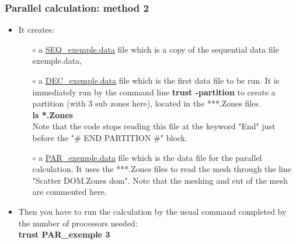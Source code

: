 \documentclass[10pt, hyperref={unicode=true,pdfusetitle, bookmarks=true,bookmarksnumbered=false,bookmarksopen=false, breaklinks=false,pdfborder={0 0 1},backref=true,colorlinks=true,linkcolor=darkblue,pageanchor}]{beamer}
\begin{document}
\begin{frame}
\frametitle{Parallel calculation: method 2}
\begin{block}{}

\begin{itemize}
\item It creates:
    \begin{itemize} 
    \item [$\circ$] a \underline{SEQ\_exemple.data} file which is a copy of the sequential data file exemple.data,
    \item [$\circ$] a \underline{DEC\_exemple.data} file which is the first data file to be run. It is immediately run by the command line \textbf{trust -partition} to create a partition (with 3 sub zones here), located in the ***.Zones files. \\
    \textbf{ls *.Zones}\\
    Note that the code stops reading this file at the keyword "End" just before the "\# END PARTITION \#" block.
    \item [$\circ$] a \underline{PAR\_exemple.data} file which is the data file for the parallel calculation. It uses the ***.Zones files to read the mesh through the line "Scatter DOM.Zones dom". Note that the meshing and cut of the mesh are commented here.
    \end{itemize}

\item Then you have to run the calculation by the usual command completed by the number of processors needed:\\
\textbf{trust PAR\_exemple 3}
\end{itemize}

\end{block}
\end{frame}
\end{document}
